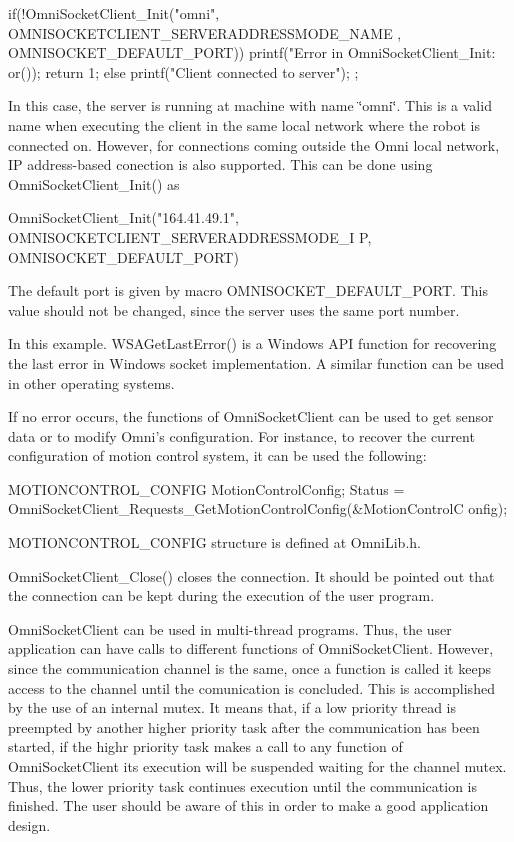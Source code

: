 \begin{DoxyCode}
        if(!OmniSocketClient_Init("omni", OMNISOCKETCLIENT_SERVERADDRESSMODE_NAME
      , OMNISOCKET_DEFAULT_PORT)){
                printf("\n Error in OmniSocketClient_Init: %
      or());
                return 1;
        }else{
                printf("\n Client connected to server");
        };    
\end{DoxyCode}


In this case, the server is running at machine with name \char`\"{}omni\char`\"{}. This is a valid name when executing the client in the same local network where the robot is connected on. However, for connections coming outside the Omni local network, IP address-\/based conection is also supported. This can be done using OmniSocketClient\_\-Init() as


\begin{DoxyCode}
        OmniSocketClient_Init("164.41.49.1", OMNISOCKETCLIENT_SERVERADDRESSMODE_I
      P, OMNISOCKET_DEFAULT_PORT) 
\end{DoxyCode}


The default port is given by macro OMNISOCKET\_\-DEFAULT\_\-PORT. This value should not be changed, since the server uses the same port number.

In this example. WSAGetLastError() is a Windows API function for recovering the last error in Windows socket implementation. A similar function can be used in other operating systems.

If no error occurs, the functions of OmniSocketClient can be used to get sensor data or to modify Omni's configuration. For instance, to recover the current configuration of motion control system, it can be used the following:


\begin{DoxyCode}
        MOTIONCONTROL_CONFIG  MotionControlConfig;
        Status = OmniSocketClient_Requests_GetMotionControlConfig(&MotionControlC
      onfig);
\end{DoxyCode}


MOTIONCONTROL\_\-CONFIG structure is defined at OmniLib.h.

OmniSocketClient\_\-Close() closes the connection. It should be pointed out that the connection can be kept during the execution of the user program.

OmniSocketClient can be used in multi-\/thread programs. Thus, the user application can have calls to different functions of OmniSocketClient. However, since the communication channel is the same, once a function is called it keeps access to the channel until the comunication is concluded. This is accomplished by the use of an internal mutex. It means that, if a low priority thread is preempted by another higher priority task after the communication has been started, if the highr priority task makes a call to any function of OmniSocketClient its execution will be suspended waiting for the channel mutex. Thus, the lower priority task continues execution until the communication is finished. The user should be aware of this in order to make a good application design. 